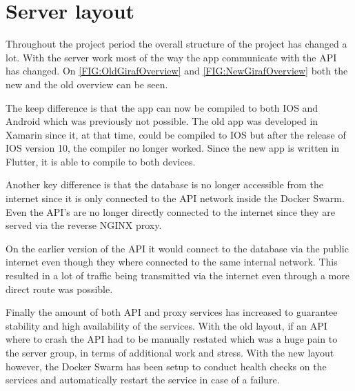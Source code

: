 \section{Server layout}

Throughout the project period the overall structure of the project has changed a lot. 
With the server work most of the way the app communicate with the API has changed. 
On \autoref{FIG:OldGirafOverview} and \autoref{FIG:NewGirafOverview} both the new and the old overview can be seen. 

The keep difference is that the app can now be compiled to both IOS and Android which was previously not possible. 
The old app was developed in Xamarin since it, at that time, could be compiled to IOS but after the release of IOS version 10, the compiler no longer worked. 
Since the new app is written in Flutter, it is able to compile to both devices. 


Another key difference is that the database is no longer accessible from the internet since it is only connected to the API network inside the Docker Swarm. 
Even the API's are no longer directly connected to the internet since they are served via the reverse NGINX proxy.

On the earlier version of the API it would connect to the database via the public internet even though they where connected to the same internal network.
This resulted in a lot of traffic being transmitted via the internet even through a more direct route was possible. 


Finally the amount of both API and proxy services has increased to guarantee stability and high availability of the services. 
With the old layout, if an API where to crash the API had to be manually restated which was a huge pain to the server group, in terms of additional work and stress. 
With the new layout however, the Docker Swarm has been setup to conduct health checks on the services and automatically restart the service in case of a failure.